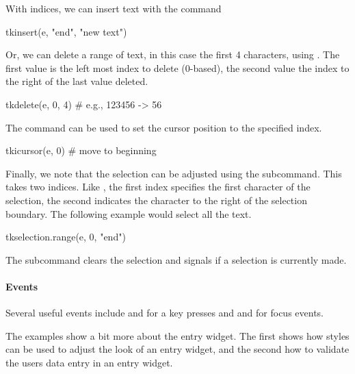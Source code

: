 With indices, we can insert  text with the  command
\begin{Schunk}
\begin{Sinput}
 tkinsert(e, "end", "new text")
\end{Sinput}
\end{Schunk}

Or, we can delete a range of text, in this case the first 4
characters, using . The first value is
the left most index to delete (0-based), the second value the index to
the right of the last value deleted.
\begin{Schunk}
\begin{Sinput}
 tkdelete(e, 0, 4) # e.g., 123456 -> 56
\end{Sinput}
\end{Schunk}

The  command can be used to set the
cursor position to the specified index.
\begin{Schunk}
\begin{Sinput}
 tkicursor(e, 0)                         # move to beginning
\end{Sinput}
\end{Schunk}

Finally, we note that the selection can be adjusted using the
 subcommand. This takes two
indices. Like , the first index specifies the first character of
the selection, the second indicates the character to the right of the
selection boundary. The following example would select all the text.
\begin{Schunk}
\begin{Sinput}
 tkselection.range(e, 0, "end")
\end{Sinput}
\end{Schunk}
The  subcommand clears the selection and  signals if a selection is currently made.

\paragraph{Events}
Several useful events include  and  for a key presses and   and  for focus events.

The examples show a bit more about the entry widget. The first  shows how styles can be used to adjust the look of an entry widget, and the second how to validate the users data entry in an entry widget.

